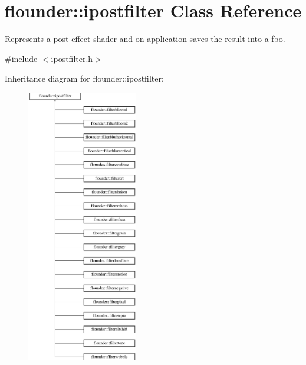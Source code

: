 \hypertarget{classflounder_1_1ipostfilter}{}\section{flounder\+:\+:ipostfilter Class Reference}
\label{classflounder_1_1ipostfilter}


Represents a post effect shader and on application saves the result into a fbo.  




{\ttfamily \#include $<$ipostfilter.\+h$>$}

Inheritance diagram for flounder\+:\+:ipostfilter\+:\begin{figure}[H]
\begin{center}
\leavevmode
\includegraphics[height=12.000000cm]{classflounder_1_1ipostfilter}
\end{center}
\end{figure}
